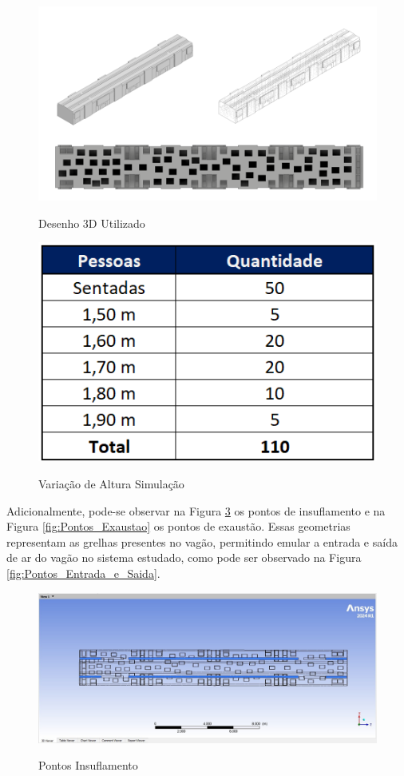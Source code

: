 \documentclass[acronym,symbols,table]{fei}
\begin{document}
\begin{figure}[!htb]
    \centering
    \caption{Desenho 3D Utilizado}
    \includegraphics[width=1\linewidth]{Imagens/Desenho_Ar_Metro.png}
    \label{fig:Desenho_Ar_Metro}
\end{figure}

\begin{figure}[!htb]
    \centering
    \caption{Variação de Altura Simulação}
    \includegraphics[width=0.5\linewidth]{Imagens/imagem_variacao_altura.png}
    \label{fig:imagem_variacao_altura}
\end{figure}

Adicionalmente, pode-se observar na Figura \ref{fig:Pontos_Insuflamento} os pontos de insuflamento e na Figura \ref{fig:Pontos_Exaustao} os pontos de exaustão. Essas geometrias representam as grelhas presentes no vagão, permitindo emular a entrada e saída de ar do vagão no sistema estudado, como pode ser observado na Figura \ref{fig:Pontos_Entrada_e_Saida}.

\begin{figure}[!htb]
    \centering
    \caption{Pontos Insuflamento}
    \includegraphics[width=1\linewidth]{Imagens/insuflamento.jpeg}
    \label{fig:Pontos_Insuflamento}
\end{figure}
\end{document}
